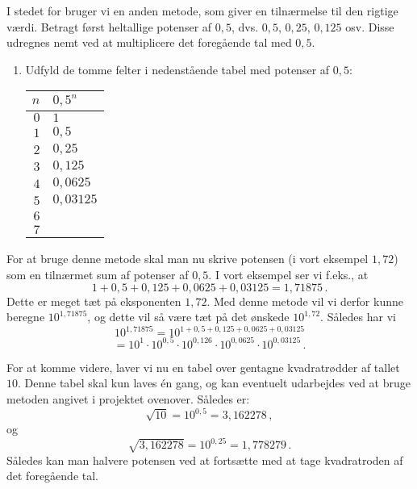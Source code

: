 \documentclass[12pt,oneside,a4paper]{article}
\theoremstyle{plain}
\begin{document}
I stedet for bruger vi en anden metode, som giver en tilnærmelse til den
rigtige værdi.  Betragt først heltallige potenser af $0,5$, dvs.
$0,5$, $0,25$, $0,125$ osv. Disse udregnes nemt ved at multiplicere
det foregående tal med $0,5$.
\begin{enumerate}[label=(\alph*)]
    \item Udfyld de tomme felter i nedenstående tabel med potenser af $0,5$:
        \begin{center}
            \begin{tabular}{|r|l|}
\hline
                $n$ & $0,5^n$ \\
                \hline
                $0$ & $1$ \\
                \hline
                $1$ & $0,5$ \\
                \hline
                $2$ & $0,25$ \\
                \hline
                $3$ & $0,125$ \\
                \hline
                $4$ & $0,0625$ \\
                \hline
                $5$ & $0,03125$ \\
                \hline
                $6$ &  \\
                \hline
                $7$ &  \\
                \hline
            \end{tabular}
        \end{center}
\end{enumerate}

For at bruge denne metode skal man nu skrive potensen (i vort eksempel $1,72$)
som en tilnærmet sum af potenser af $0,5$. I vort eksempel ser vi f.eks., at
\[
    1 + 0,5 + 0,125 + 0,0625 + 0,03125 = 1,71875 \,.
\]
Dette er meget tæt på eksponenten $1,72$. Med denne metode vil vi derfor kunne
beregne $10^{1,71875}$, og dette vil så være tæt på det ønskede $10^{1,72}$.
Således har vi
\[
    10^{1,71875} = 10^{1 + 0,5 + 0,125 + 0,0625 + 0,03125}
\]
\[
    = 10^1 \cdot 10^{0,5} \cdot 10^{0,126} \cdot 10^{0,0625} \cdot 10^{0,03125} \,.
\]

For at komme videre, laver vi nu en tabel over gentagne kvadratrødder af tallet
$10$. Denne tabel skal kun laves én gang, og kan eventuelt udarbejdes ved at
bruge metoden angivet i projektet ovenover.  Således er:
\[
    \sqrt{10} = 10^{0,5} = 3,162278 \,,
\]
og
\[
    \sqrt{3,162278} = 10^{0,25} = 1,778279 \,.
\]
Således kan man halvere potensen ved at fortsætte med at tage kvadratroden af
det foregående tal.
\end{document}
